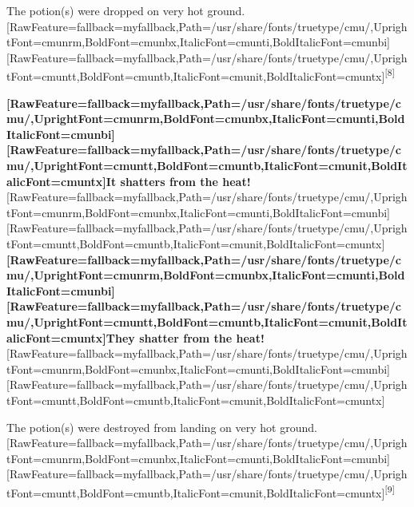 \begin{myquote}
\item{}The potion(s) were dropped on very hot ground.\allowbreak{}\setmainfont{cmunrm.ttf}[RawFeature={fallback=myfallback},Path=/usr/share/fonts/truetype/cmu/,UprightFont=cmunrm,BoldFont=cmunbx,ItalicFont=cmunti,BoldItalicFont=cmunbi]\setmonofont{cmunrm.ttf}[RawFeature={fallback=myfallback},Path=/usr/share/fonts/truetype/cmu/,UprightFont=cmuntt,BoldFont=cmuntb,ItalicFont=cmunit,BoldItalicFont=cmuntx]\textsuperscript{{$\text{[}$}8{$\text{]}$}}
\end{myquote}

{\bfseries \allowbreak{}\setmainfont{cmunbx.ttf}[RawFeature={fallback=myfallback},Path=/usr/share/fonts/truetype/cmu/,UprightFont=cmunrm,BoldFont=cmunbx,ItalicFont=cmunti,BoldItalicFont=cmunbi]\setmonofont{cmunbx.ttf}[RawFeature={fallback=myfallback},Path=/usr/share/fonts/truetype/cmu/,UprightFont=cmuntt,BoldFont=cmuntb,ItalicFont=cmunit,BoldItalicFont=cmuntx]\bfseries It shatters from the heat!}\allowbreak{}\setmainfont{cmunrm.ttf}[RawFeature={fallback=myfallback},Path=/usr/share/fonts/truetype/cmu/,UprightFont=cmunrm,BoldFont=cmunbx,ItalicFont=cmunti,BoldItalicFont=cmunbi]\setmonofont{cmunrm.ttf}[RawFeature={fallback=myfallback},Path=/usr/share/fonts/truetype/cmu/,UprightFont=cmuntt,BoldFont=cmuntb,ItalicFont=cmunit,BoldItalicFont=cmuntx]
{\bfseries \allowbreak{}\setmainfont{cmunbx.ttf}[RawFeature={fallback=myfallback},Path=/usr/share/fonts/truetype/cmu/,UprightFont=cmunrm,BoldFont=cmunbx,ItalicFont=cmunti,BoldItalicFont=cmunbi]\setmonofont{cmunbx.ttf}[RawFeature={fallback=myfallback},Path=/usr/share/fonts/truetype/cmu/,UprightFont=cmuntt,BoldFont=cmuntb,ItalicFont=cmunit,BoldItalicFont=cmuntx]\bfseries They shatter from the heat!}\allowbreak{}\setmainfont{cmunrm.ttf}[RawFeature={fallback=myfallback},Path=/usr/share/fonts/truetype/cmu/,UprightFont=cmunrm,BoldFont=cmunbx,ItalicFont=cmunti,BoldItalicFont=cmunbi]\setmonofont{cmunrm.ttf}[RawFeature={fallback=myfallback},Path=/usr/share/fonts/truetype/cmu/,UprightFont=cmuntt,BoldFont=cmuntb,ItalicFont=cmunit,BoldItalicFont=cmuntx]

\begin{myquote}
\item{}The potion(s) were destroyed from landing on very hot ground.\allowbreak{}\setmainfont{cmunrm.ttf}[RawFeature={fallback=myfallback},Path=/usr/share/fonts/truetype/cmu/,UprightFont=cmunrm,BoldFont=cmunbx,ItalicFont=cmunti,BoldItalicFont=cmunbi]\setmonofont{cmunrm.ttf}[RawFeature={fallback=myfallback},Path=/usr/share/fonts/truetype/cmu/,UprightFont=cmuntt,BoldFont=cmuntb,ItalicFont=cmunit,BoldItalicFont=cmuntx]\textsuperscript{{$\text{[}$}9{$\text{]}$}}
\end{myquote}

